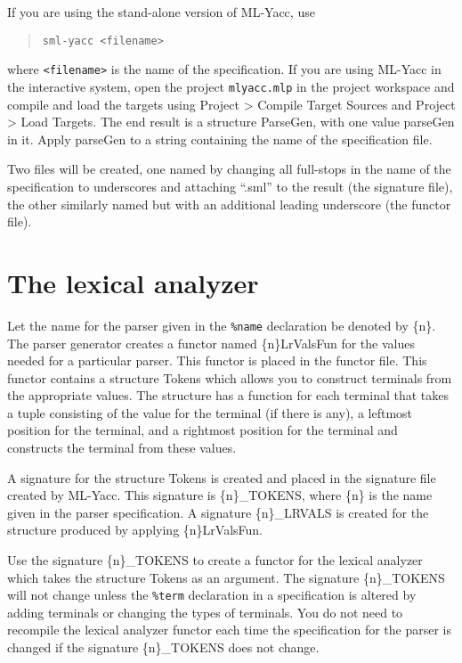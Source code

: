 \documentclass{article}
\begin{document}
\smallskip
If you are using the stand-alone version of ML-Yacc, use
\begin{quote}
\begin{verbatim}
sml-yacc <filename> 
\end{verbatim}
\end{quote}
where \verb+<filename>+ is the
name of the specification.  If you are using ML-Yacc in the
interactive system, 
open the project \verb+mlyacc.mlp+ in the project workspace and
compile and load the targets using 
{\sffamily Project > Compile Target Sources} and 
{\sffamily Project > Load Targets}. 
The end result is a structure ParseGen, with one value parseGen in it.
Apply parseGen to a string containing the name of the specification
file.

Two files will be created, one named by changing all full-stops in the
name of the specification to underscores and attaching ``.sml'' to the
result (the signature file), the other similarly named but with an
additional leading underscore (the functor file).


\section{The lexical analyzer}

Let the name for the parser given in the {\tt \%name} declaration be
denoted by \{n\}.  The parser generator creates a functor named
\{n\}LrValsFun for the values needed for a particular parser.  This
functor is placed in the functor file.  This functor contains a
structure Tokens which allows you to construct terminals from the
appropriate values.  The structure has a function for each terminal
that takes a tuple consisting of the value for the terminal (if there
is any), a leftmost position for the terminal, and a rightmost
position for the terminal and constructs the terminal from these
values.

A signature for the structure Tokens is created and placed in the signature
file created by ML-Yacc.  This signature is \{n\}\_TOKENS,
 where \{n\} is
the name given in the parser specification.  A signature
\{n\}\_LRVALS is created for the structure produced by
applying \{n\}LrValsFun.

Use the signature \{n\}\_TOKENS to create a functor for the
lexical analyzer which takes the structure Tokens as an argument.  The
signature \{n\}\_TOKENS
will not change unless the {\tt \%term} declaration in a
specification is altered by adding terminals or
changing the types of terminals.  You do not need to recompile
the lexical analyzer functor each time the specification for
the parser is changed if the
signature \{n\}\_TOKENS does not change.
\end{document}
